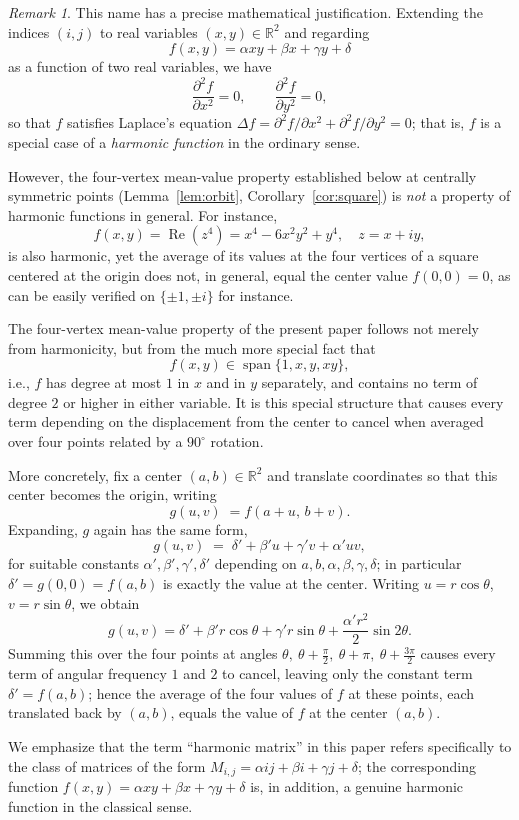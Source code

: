 \documentclass[a4paper,11pt]{article}
\theoremstyle{plain}
\theoremstyle{definition}
\theoremstyle{remark}
\newtheorem{remark}[theorem]{Remark}
\begin{document}
\begin{remark}
This name has a precise mathematical justification. Extending the
indices $(i,j)$ to real variables $(x,y)\in\mathbb{R}^2$ and regarding
\[
  f(x,y)=\alpha xy+\beta x+\gamma y+\delta
\]
as a function of two real variables, we have
\[
  \frac{\partial^2 f}{\partial x^2}=0,\qquad
  \frac{\partial^2 f}{\partial y^2}=0,
\]
so that $f$ satisfies Laplace's equation
$\Delta f=\partial^2f/\partial x^2+\partial^2f/\partial y^2=0$; that is,
$f$ is a special case of a \emph{harmonic function} in the ordinary sense.

However, the four-vertex mean-value property established below at
centrally symmetric points (Lemma~\ref{lem:orbit}, Corollary~\ref{cor:square})
is \emph{not} a property of harmonic functions in general. For instance,
\[
  f(x,y)=\operatorname{Re}(z^4)
  =x^4-6x^2y^2+y^4,
  \quad z=x+iy,
\]
is also harmonic, yet the average of its values at the four vertices of
a square centered at the origin does not, in general, equal the center
value $f(0,0)=0$, as can be easily verified on $\{\pm 1,\pm i\}$ for instance.

The four-vertex mean-value property of the present paper follows not
merely from harmonicity, but from the much more special fact that
\[
  f(x,y)\in\operatorname{span}\{1,x,y,xy\},
\]
i.e., $f$ has degree at most $1$ in $x$ and in $y$ separately, and
contains no term of degree $2$ or higher in either variable. It is this
special structure that causes every term depending on the displacement
from the center to cancel when averaged over four points related by a
$90^\circ$ rotation.

More concretely, fix a center $(a,b)\in\mathbb{R}^2$ and translate
coordinates so that this center becomes the origin, writing
\[
  g(u,v)\;=f(a+u,\,b+v).
\]
Expanding, $g$ again has the same form,
\[
  g(u,v)\;=\;\delta'+\beta' u+\gamma' v+\alpha' uv,
\]
for suitable constants $\alpha',\beta',\gamma',\delta'$ depending on
$a,b,\alpha,\beta,\gamma,\delta$; in particular $\delta'=g(0,0)=f(a,b)$
is exactly the value at the center. Writing $u=r\cos\theta$,
$v=r\sin\theta$, we obtain
\[
  g(u,v)
  =
  \delta'
  +\beta' r\cos\theta
  +\gamma' r\sin\theta
  +\frac{\alpha' r^2}{2}\sin 2\theta.
\]
Summing this over the four points at angles
$\theta,\ \theta+\tfrac{\pi}{2},\ \theta+\pi,\ \theta+\tfrac{3\pi}{2}$
causes every term of angular frequency $1$ and $2$ to cancel, leaving
only the constant term $\delta'=f(a,b)$; hence the average of the four
values of $f$ at these points, each translated back by $(a,b)$, equals
the value of $f$ at the center $(a,b)$.

We emphasize that the term ``harmonic matrix'' in this paper refers
specifically to the class of matrices of the form
$M_{i,j}=\alpha ij+\beta i+\gamma j+\delta$; the corresponding function
$f(x,y)=\alpha xy+\beta x+\gamma y+\delta$ is, in addition, a genuine
harmonic function in the classical sense.
\end{remark}
\end{document}
